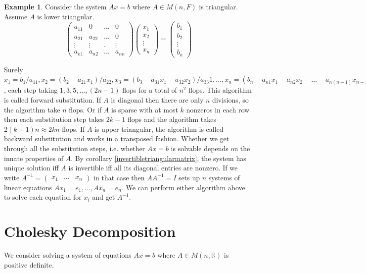 \documentclass[12pt]{amsart}
\theoremstyle{definition}
\newtheorem{example}[theorem]{Example}
\begin{document}
\begin{example} Consider the system $Ax = b$ where $A \in M(n, F)$ is triangular. Assume $A$ is lower triangular.
$$\left(\begin{array}{cccc} a_{11} & 0 & \dots & 0 \\ a_{21} & a_{22} & \dots & 0 \\ \vdots & \vdots & . & \vdots \\ a_{n1} & a_{n2} & \dots & a_{nn} \end{array}\right)\left(\begin{array}{c} x_1 \\ x_2 \\ \vdots \\ x_n \end{array}\right) = \left(\begin{array}{c} b_1 \\ b_2 \\ \vdots \\ b_n \end{array}\right) $$

Surely $x_1 = b_1/a_{11}, x_2 = (b_2 - a_{21}x_1)/a_{22}, x_3 = (b_3 - a_{31}x_1 - a_{32}x_2)/a_{33}1, \dots, x_n = (b_n - a_{n1}x_1 - a_{n2}x_2 - \ldots - a_{n(n-1)}x_{n-1})/a_nn$, each step taking $1, 3, 5, \dots ,(2n-1)$ flops for a total of $n^2$ flops. This algorithm is called forward substitution. If $A$ is diagonal then there are only $n$ divisions, so the algorithm take $n$ flops. Or if $A$ is sparse with at most $k$ nonzeros in each row then each substitution step takes $2k -1$ flops and the algorithm takes $2(k -1)n \approx 2kn$ flops. If $A$ is upper triangular, the algorithm is called backward substitution and works in a transposed fashion. Whether we get through all the substitution steps, i.e. whether $Ax = b$ is solvable depends on the innate properties of $A$. By corollary \ref{invertibletriangularmatrix}, the system has unique solution iff $A$ is invertible iff all its diagonal entries are nonzero. If we write $A^{-1} = \left(\begin{array}{ccc} x_1 & \dots & x_n \end{array}\right)$ in that case then $AA^{-1} = I$ sets up $n$ systems of linear equations $Ax_1 = e_1, \dots , Ax_n = e_n$. We can perform either algorithm above to solve each equation for $x_i$ and get $A^{-1}$.
\end{example}

\section{Cholesky Decomposition} We consider solving a system of equations $Ax = b$ where $A \in M(n, \mathbb{R})$ is positive definite.
\end{document}
